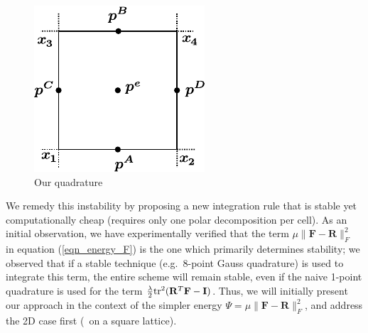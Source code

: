 \begin{figure}[th]
\centering
\includegraphics[width=.3\columnwidth]{elasticity/figures/quadrature}
\caption{Our quadrature}
\label{fig_quadrature}
\end{figure}
We remedy this instability by proposing a new integration rule that is
stable yet computationally cheap (requires only one polar decomposition per cell). As an initial observation, we have experimentally verified that the term $\mu\|\mathbf{F}-\mathbf{R}\|_F^2$ in equation (\ref{eqn_energy_F}) is
the one which primarily determines stability; we observed that if a stable technique (e.g.\ 8-point Gauss quadrature) is used to integrate this term, the entire scheme will remain
stable, even if the naive 1-point quadrature is used for the term  $\frac{\lambda}{2}\mbox{tr}^2(\mathbf{R}^T\mathbf{F}-\mathbf{I})$. Thus, we will initially present our approach in the context
of the simpler energy $\Psi=\mu\|\mathbf{F}-\mathbf{R}\|_F^2$, and address the 2D case first (\ on a square lattice). 



